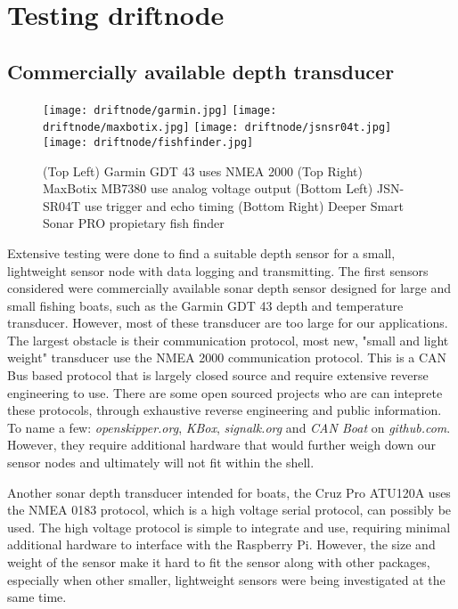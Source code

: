 \section[Depth Sensor]{Testing driftnode}

\subsection[Overview]{Commercially available depth transducer}

\begin{figure}[h]
	\begin{center}
	\texttt{[image: driftnode/garmin.jpg]}
	\texttt{[image: driftnode/maxbotix.jpg]}
	\texttt{[image: driftnode/jsnsr04t.jpg]}
	\texttt{[image: driftnode/fishfinder.jpg]}
	\caption[Various range finder]{
		(Top Left) Garmin GDT 43 uses NMEA 2000 
		(Top Right) MaxBotix MB7380 use analog voltage output 
		(Bottom Left) JSN-SR04T use trigger and echo timing
		(Bottom Right) Deeper Smart Sonar PRO propietary fish finder 
	} \label{fig:sonarsensors}
	\end{center}
	\vspace{-1em}
\end{figure}

Extensive testing were done to find a suitable depth sensor for a small, lightweight sensor node with data logging and transmitting.
The first sensors considered were commercially available sonar depth sensor designed for large and small fishing boats, such as the Garmin GDT 43 depth and temperature transducer.
However, most of these transducer are too large for our applications.
The largest obstacle is their communication protocol, most new, "small and light weight" transducer use the NMEA 2000 communication protocol.
This is a CAN Bus based protocol that is largely closed source and require extensive reverse engineering to use.
There are some open sourced projects who are can inteprete these protocols, through exhaustive reverse engineering and public information.
To name a few: \emph{openskipper.org}, \emph{KBox}, \emph{signalk.org} and \emph{CAN Boat} on \emph{github.com}.
However, they require additional hardware that would further weigh down our sensor nodes and ultimately will not fit within the shell.

Another sonar depth transducer intended for boats, the Cruz Pro ATU120A uses the NMEA 0183 protocol, which is a high voltage serial protocol, can possibly be used.
The high voltage protocol is simple to integrate and use, requiring minimal additional hardware to interface with the Raspberry Pi.
However, the size and weight of the sensor make it hard to fit the sensor along with other packages, especially when other smaller, lightweight sensors were being investigated at the same time.

